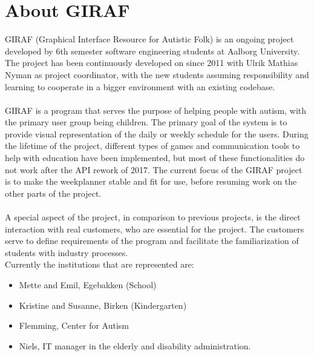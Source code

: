 \section{About GIRAF}
GIRAF (Graphical Interface Resource for Autistic Folk) is an ongoing project developed by 6th semester software engineering students at Aalborg University. 
The project has been continuously developed on since 2011 with Ulrik Mathias Nyman as project coordinator, with the new students assuming responsibility and learning to cooperate in a bigger environment with an existing codebase. 
\\\\
GIRAF is a program that serves the purpose of helping people with autism, with the primary user group being children.
The primary goal of the system is to provide visual representation of the daily or weekly schedule for the users.
During the lifetime of the project, different types of games and communication tools to help with education have been implemented, but most of these functionalities do not work after the API rework of 2017. The current focus of the GIRAF project is to make the weekplanner stable and fit for use, before resuming work on the other parts of the project. 
\\\\
A special aspect of the project, in comparison to previous projects, is the direct interaction with real customers, who are essential for the project.
The customers serve to define requirements of the program and facilitate the familiarization of students with industry processes.
\\
\noindent
Currently the institutions that are represented are: 
\begin{itemize}
    \item Mette and Emil, Egebakken (School)
    \item Kristine and Susanne, Birken (Kindergarten)
    \item Flemming, Center for Autism
    \item Niels, IT manager in the elderly and disability administration.
\end{itemize}
